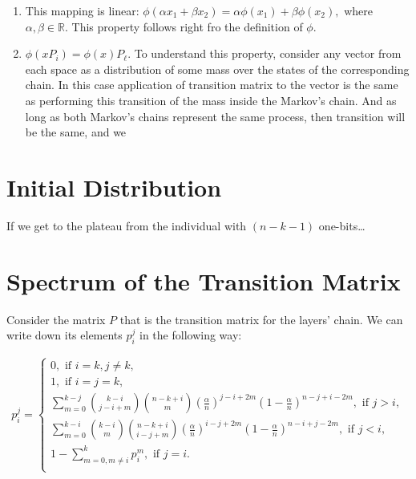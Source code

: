 \documentclass{article}
\begin{document}
\begin{enumerate}
  \item This mapping is linear: $\phi(\alpha x_1 + \beta x_2) = \alpha \phi(x_1) + \beta \phi(x_2),$ where $\alpha, \beta \in \mathbb{R}.$ This property follows right fro the definition of $\phi.$
  \item $\phi(x P_i) = \phi(x) P_\ell.$ To understand this property, consider any vector from each space as a distribution of some mass over the states of the corresponding chain. In this case application of transition matrix to the vector is the same as performing this transition of the mass inside the Markov's chain. And as long as both Markov's chains represent the same process, then transition will be the same, and we 
\end{enumerate}

\section{Initial Distribution}

If we get to the plateau from the individual with $(n - k - 1)$ one-bits\dots

\section{Spectrum of the Transition Matrix}

Consider the matrix $P$ that is the transition matrix for the layers' chain. We can write down its elements $p_i^j$ in the following way:

\begin{align*}
  p_i^j = \begin{cases}
    0, \text{ if } i = k, j \ne k, \\
    1, \text{ if } i = j = k, \\
    \sum\limits_{m = 0}^{k - j} \binom{k - i}{j - i + m} \binom{n - k + i}{m} \left(\frac{\alpha}{n}\right)^{j - i + 2m} \left(1 - \frac{\alpha}{n}\right)^{n - j + i - 2m}, \text{ if } j > i, \\
      \sum\limits_{m = 0}^{k - i} \binom{k - i}{m} \binom{n - k + i}{i - j + m} \left(\frac{\alpha}{n}\right)^{i - j + 2m} \left(1 - \frac{\alpha}{n}\right)^{n - i + j - 2m}, \text{ if } j < i, \\
      1 - \sum\limits_{m = 0, m \ne i}^k p_i^m, \text{ if } j = i. \\
  \end{cases}
\end{align*}
\end{document}
